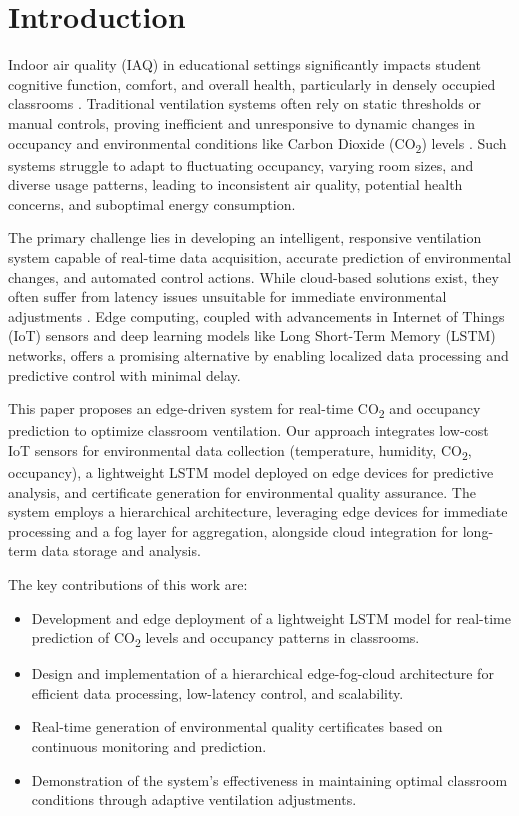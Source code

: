 \section{Introduction}
\label{sec:introduction}

Indoor air quality (IAQ) in educational settings significantly impacts student cognitive function, comfort, and overall health, particularly in densely occupied classrooms \cite{Azuma2018}. Traditional ventilation systems often rely on static thresholds or manual controls, proving inefficient and unresponsive to dynamic changes in occupancy and environmental conditions like Carbon Dioxide (CO\textsubscript{2}) levels \cite{McNeill2022}. Such systems struggle to adapt to fluctuating occupancy, varying room sizes, and diverse usage patterns, leading to inconsistent air quality, potential health concerns, and suboptimal energy consumption.

The primary challenge lies in developing an intelligent, responsive ventilation system capable of real-time data acquisition, accurate prediction of environmental changes, and automated control actions. While cloud-based solutions exist, they often suffer from latency issues unsuitable for immediate environmental adjustments \cite{Idrees2021}. Edge computing, coupled with advancements in Internet of Things (IoT) sensors and deep learning models like Long Short-Term Memory (LSTM) networks, offers a promising alternative by enabling localized data processing and predictive control with minimal delay.

This paper proposes an edge-driven system for real-time CO\textsubscript{2} and occupancy prediction to optimize classroom ventilation. Our approach integrates low-cost IoT sensors for environmental data collection (temperature, humidity, CO\textsubscript{2}, occupancy), a lightweight LSTM model deployed on edge devices for predictive analysis, and certificate generation for environmental quality assurance. The system employs a hierarchical architecture, leveraging edge devices for immediate processing and a fog layer for aggregation, alongside cloud integration for long-term data storage and analysis.

The key contributions of this work are:
\begin{itemize}
    \item Development and edge deployment of a lightweight LSTM model for real-time prediction of CO\textsubscript{2} levels and occupancy patterns in classrooms.
    \item Design and implementation of a hierarchical edge-fog-cloud architecture for efficient data processing, low-latency control, and scalability.
    \item Real-time generation of environmental quality certificates based on continuous monitoring and prediction.
    \item Demonstration of the system's effectiveness in maintaining optimal classroom conditions through adaptive ventilation adjustments.
\end{itemize}

